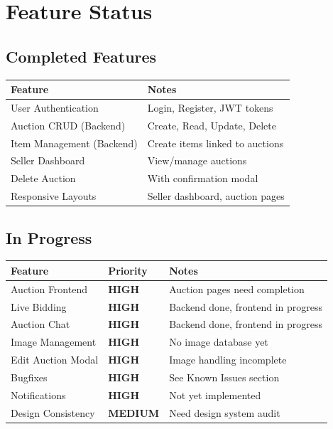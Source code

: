 \documentclass[12pt,a4paper]{article}
\newcommand{\cmark}{\ding{51}}
\begin{document}
\section{Feature Status}

\subsection{Completed Features}

\begin{successbox}[\cmark~Completed]
\begin{tabularx}{\textwidth}{|l|X|}
\hline
\textbf{Feature} & \textbf{Notes} \\
\hline
User Authentication & Login, Register, JWT tokens \\
\hline
Auction CRUD (Backend) & Create, Read, Update, Delete \\
\hline
Item Management (Backend) & Create items linked to auctions \\
\hline
Seller Dashboard & View/manage auctions \\
\hline
Delete Auction & With confirmation modal \\
\hline
Responsive Layouts & Seller dashboard, auction pages \\
\hline
\end{tabularx}
\end{successbox}

\subsection{In Progress}

\begin{warningbox}[In Progress]
\begin{tabularx}{\textwidth}{|l|l|X|}
\hline
\textbf{Feature} & \textbf{Priority} & \textbf{Notes} \\
\hline
Auction Frontend & \textbf{HIGH} & Auction pages need completion \\
\hline
Live Bidding & \textbf{HIGH} & Backend done, frontend in progress \\
\hline
Auction Chat & \textbf{HIGH} & Backend done, frontend in progress \\
\hline
Image Management & \textbf{HIGH} & No image database yet \\
\hline
Edit Auction Modal & \textbf{HIGH} & Image handling incomplete \\
\hline
Bugfixes & \textbf{HIGH} & See Known Issues section \\
\hline
Notifications & \textbf{HIGH} & Not yet implemented \\
\hline
Design Consistency & \textbf{MEDIUM} & Need design system audit \\
\hline
\end{tabularx}
\end{warningbox}
\end{document}
